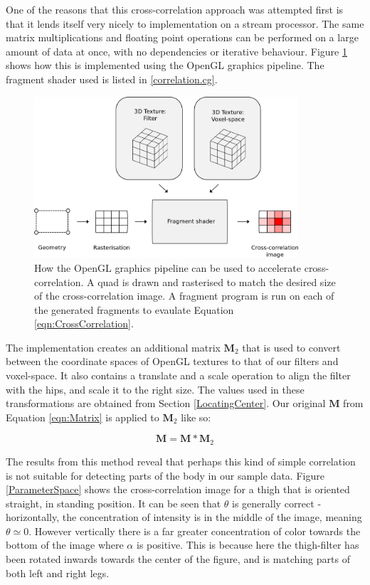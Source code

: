 \bigskip
\noindent One of the reasons that this cross-correlation approach was attempted first is that it lends itself very nicely to implementation on a stream processor.
The same matrix multiplications and floating point operations can be performed on a large amount of data at once, with no dependencies or iterative behaviour.
Figure \ref{CrossCorrelation} shows how this is implemented using the OpenGL graphics pipeline.
The fragment shader used is listed in \ref{correlation.cg}.

\begin{figure}[tb]
	\vspace{-10pt}
	\centering
	\includegraphics[height=6cm]{correlation.png}
	\caption{How the OpenGL graphics pipeline can be used to accelerate cross-correlation.
		A quad is drawn and rasterised to match the desired size of the cross-correlation image.
		A fragment program is run on each of the generated fragments to evaulate Equation \ref{eqn:CrossCorrelation}.}
	\label{CrossCorrelation}
\end{figure}

The implementation creates an additional matrix $\mathbf{M}_2$ that is used to convert between the coordinate spaces of OpenGL textures to that of our filters and voxel-space.
It also contains a translate and a scale operation to align the filter with the hips, and scale it to the right size.
The values used in these transformations are obtained from Section \ref{LocatingCenter}.
Our original $\mathbf{M}$ from Equation \ref{eqn:Matrix} is applied to $\mathbf{M}_2$ like so:

\begin{equation}
	\mathbf{M} = \mathbf{M} * \mathbf{M}_2
\end{equation}

\bigskip
\noindent The results from this method reveal that perhaps this kind of simple correlation is not suitable for detecting parts of the body in our sample data.
Figure \ref{ParameterSpace} shows the cross-correlation image for a thigh that is oriented straight, in standing position.
It can be seen that $\theta$ is generally correct - horizontally, the concentration of intensity is in the middle of the image, meaning $\theta \simeq 0$.
However vertically there is a far greater concentration of color towards the bottom of the image where $\alpha$ is positive.
This is because here the thigh-filter has been rotated inwards towards the center of the figure, and is matching parts of both left and right legs.

